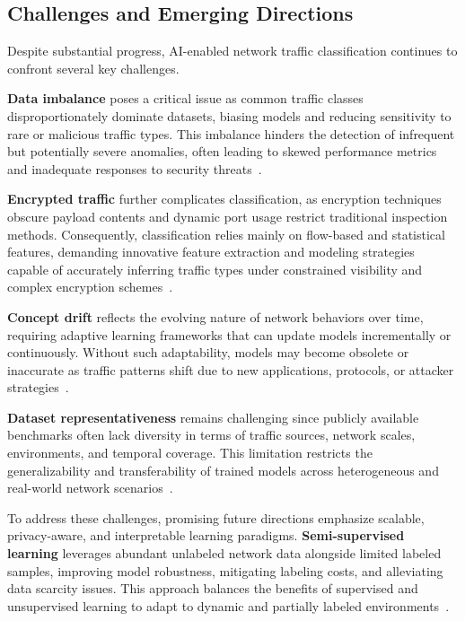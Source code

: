 \documentclass[sigconf]{acmart}
\begin{document}
\subsection{Challenges and Emerging Directions}

Despite substantial progress, AI-enabled network traffic classification continues to confront several key challenges.

\textbf{Data imbalance} poses a critical issue as common traffic classes disproportionately dominate datasets, biasing models and reducing sensitivity to rare or malicious traffic types. This imbalance hinders the detection of infrequent but potentially severe anomalies, often leading to skewed performance metrics and inadequate responses to security threats~\cite{ref51}.

\textbf{Encrypted traffic} further complicates classification, as encryption techniques obscure payload contents and dynamic port usage restrict traditional inspection methods. Consequently, classification relies mainly on flow-based and statistical features, demanding innovative feature extraction and modeling strategies capable of accurately inferring traffic types under constrained visibility and complex encryption schemes~\cite{ref51}.

\textbf{Concept drift} reflects the evolving nature of network behaviors over time, requiring adaptive learning frameworks that can update models incrementally or continuously. Without such adaptability, models may become obsolete or inaccurate as traffic patterns shift due to new applications, protocols, or attacker strategies~\cite{ref51}.

\textbf{Dataset representativeness} remains challenging since publicly available benchmarks often lack diversity in terms of traffic sources, network scales, environments, and temporal coverage. This limitation restricts the generalizability and transferability of trained models across heterogeneous and real-world network scenarios~\cite{ref51}.

To address these challenges, promising future directions emphasize scalable, privacy-aware, and interpretable learning paradigms. \textbf{Semi-supervised learning} leverages abundant unlabeled network data alongside limited labeled samples, improving model robustness, mitigating labeling costs, and alleviating data scarcity issues. This approach balances the benefits of supervised and unsupervised learning to adapt to dynamic and partially labeled environments~\cite{ref50,ref51}.
\end{document}
